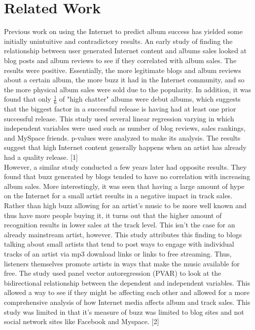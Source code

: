 \documentclass[conference]{IEEEtran}
\begin{document}
\section{Related Work}
Previous work on using the Internet to predict album success has yielded some initially unintuitive and contradictory results. An early study of finding the relationship between user generated Internet content and albums sales looked at blog posts and album reviews to see if they correlated with album sales. The results were positive. Essentially, the more legitimate blogs and album reviews about a certain album, the more buzz it had in the Internet community, and so the more physical album sales were sold due to the popularity. In addition, it was found that only $\frac{1}{6}$ of "high chatter" albums were debut albums, which suggests that the biggest factor in a successful release is having had at least one prior successful release. This study used several linear regression varying in which independent variables were used such as number of blog reviews, sales rankings, and MySpace friends. p-values were analyzed to make its analysis. The results suggest that high Internet content generally happens when an artist has already had a quality release. [1]\\

However, a similar study conducted a few years later had opposite results. They found that buzz generated by blogs tended to have no correlation with increasing album sales. More interestingly, it was seen that having a large amount of hype on the Internet for a small artist results in a negative impact in track sales. Rather than high buzz allowing for an artist's music to be more well known and thus have more people buying it, it turns out that the higher amount of recognition results in lower sales at the track level. This isn't the case for an already mainstream artist, however. This study attributes this finding to blogs talking about small artists that tend to post ways to engage with individual tracks of an artist via mp3 download links or links to free streaming. Thus, listeners themselves promote artists in ways that make the music available for free. The study used panel vector autoregression (PVAR) to look at the bidirectional relationship between the dependent and independent variables. This allowed a way to see if they might be affecting each other and allowed for a more comprehensive analysis of how Internet media affects album and track sales. This study was limited in that it's measure of buzz was limited to blog sites and not social network sites like Facebook and Myspace.  [2]
\end{document}
